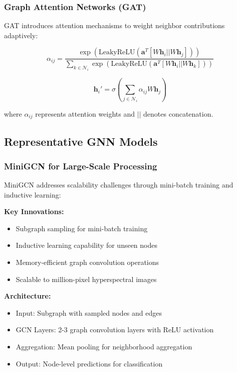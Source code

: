 \documentclass[journal]{IEEEtran}
\begin{document}
\subsubsection{Graph Attention Networks (GAT)}

GAT introduces attention mechanisms to weight neighbor contributions adaptively:

\begin{equation}
\alpha_{ij} = \frac{\exp(\text{LeakyReLU}(\mathbf{a}^T[W\mathbf{h}_i || W\mathbf{h}_j]))}{\sum_{k \in \mathcal{N}_i} \exp(\text{LeakyReLU}(\mathbf{a}^T[W\mathbf{h}_i || W\mathbf{h}_k]))}
\end{equation}

\begin{equation}
\mathbf{h}_i' = \sigma\left(\sum_{j \in \mathcal{N}_i} \alpha_{ij} W \mathbf{h}_j\right)
\end{equation}

where $\alpha_{ij}$ represents attention weights and $||$ denotes concatenation.

\subsection{Representative GNN Models}

\subsubsection{MiniGCN for Large-Scale Processing}

MiniGCN \cite{hong2020more} addresses scalability challenges through mini-batch training and inductive learning:

\textbf{Key Innovations:}
\begin{itemize}
\item Subgraph sampling for mini-batch training
\item Inductive learning capability for unseen nodes
\item Memory-efficient graph convolution operations
\item Scalable to million-pixel hyperspectral images
\end{itemize}

\textbf{Architecture:}
\begin{itemize}
\item Input: Subgraph with sampled nodes and edges
\item GCN Layers: 2-3 graph convolution layers with ReLU activation
\item Aggregation: Mean pooling for neighborhood aggregation
\item Output: Node-level predictions for classification
\end{itemize}
\end{document}
